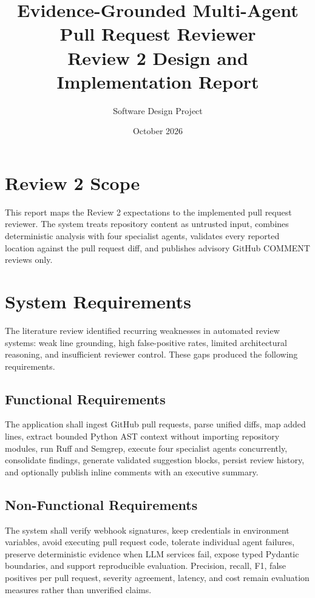 \documentclass[11pt,a4paper]{article}
\title{Evidence-Grounded Multi-Agent Pull Request Reviewer\\Review 2 Design and Implementation Report}
\author{Software Design Project}
\date{October 2026}
\begin{document}
\maketitle

\section{Review 2 Scope}
This report maps the Review 2 expectations to the implemented pull request reviewer. The system treats repository content as untrusted input, combines deterministic analysis with four specialist agents, validates every reported location against the pull request diff, and publishes advisory GitHub COMMENT reviews only.

\section{System Requirements}
The literature review identified recurring weaknesses in automated review systems: weak line grounding, high false-positive rates, limited architectural reasoning, and insufficient reviewer control. These gaps produced the following requirements.

\subsection{Functional Requirements}
The application shall ingest GitHub pull requests, parse unified diffs, map added lines, extract bounded Python AST context without importing repository modules, run Ruff and Semgrep, execute four specialist agents concurrently, consolidate findings, generate validated suggestion blocks, persist review history, and optionally publish inline comments with an executive summary.

\subsection{Non-Functional Requirements}
The system shall verify webhook signatures, keep credentials in environment variables, avoid executing pull request code, tolerate individual agent failures, preserve deterministic evidence when LLM services fail, expose typed Pydantic boundaries, and support reproducible evaluation. Precision, recall, F1, false positives per pull request, severity agreement, latency, and cost remain evaluation measures rather than unverified claims.
\end{document}
